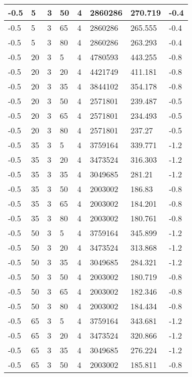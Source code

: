 \begin{longtable}{|p{1.4cm}|p{1.4cm}|p{1.4cm}|p{1.4cm}|p{1.4cm}|p{1.4cm}|p{1.4cm}|p{1.5cm}|}
        -0.5 & 5 & 3 & 50 & 4 & 2860286 & 270.719 & -0.4 \\ \hline
        -0.5 & 5 & 3 & 65 & 4 & 2860286 & 265.555 & -0.4 \\ \hline
        -0.5 & 5 & 3 & 80 & 4 & 2860286 & 263.293 & -0.4 \\ \hline
        -0.5 & 20 & 3 & 5 & 4 & 4780593 & 443.255 & -0.8 \\ \hline
        -0.5 & 20 & 3 & 20 & 4 & 4421749 & 411.181 & -0.8 \\ \hline
        -0.5 & 20 & 3 & 35 & 4 & 3844102 & 354.178 & -0.8 \\ \hline
        -0.5 & 20 & 3 & 50 & 4 & 2571801 & 239.487 & -0.5 \\ \hline
        -0.5 & 20 & 3 & 65 & 4 & 2571801 & 234.493 & -0.5 \\ \hline
        -0.5 & 20 & 3 & 80 & 4 & 2571801 & 237.27 & -0.5 \\ \hline
        -0.5 & 35 & 3 & 5 & 4 & 3759164 & 339.771 & -1.2 \\ \hline
        -0.5 & 35 & 3 & 20 & 4 & 3473524 & 316.303 & -1.2 \\ \hline
        -0.5 & 35 & 3 & 35 & 4 & 3049685 & 281.21 & -1.2 \\ \hline
        -0.5 & 35 & 3 & 50 & 4 & 2003002 & 186.83 & -0.8 \\ \hline
        -0.5 & 35 & 3 & 65 & 4 & 2003002 & 184.201 & -0.8 \\ \hline
        -0.5 & 35 & 3 & 80 & 4 & 2003002 & 180.761 & -0.8 \\ \hline
        -0.5 & 50 & 3 & 5 & 4 & 3759164 & 345.899 & -1.2 \\ \hline
        -0.5 & 50 & 3 & 20 & 4 & 3473524 & 313.868 & -1.2 \\ \hline
        -0.5 & 50 & 3 & 35 & 4 & 3049685 & 284.321 & -1.2 \\ \hline
        -0.5 & 50 & 3 & 50 & 4 & 2003002 & 180.719 & -0.8 \\ \hline
        -0.5 & 50 & 3 & 65 & 4 & 2003002 & 182.346 & -0.8 \\ \hline
        -0.5 & 50 & 3 & 80 & 4 & 2003002 & 184.434 & -0.8 \\ \hline
        -0.5 & 65 & 3 & 5 & 4 & 3759164 & 343.681 & -1.2 \\ \hline
        -0.5 & 65 & 3 & 20 & 4 & 3473524 & 320.866 & -1.2 \\ \hline
        -0.5 & 65 & 3 & 35 & 4 & 3049685 & 276.224 & -1.2 \\ \hline
        -0.5 & 65 & 3 & 50 & 4 & 2003002 & 185.811 & -0.8 \\ \hline

\end{longtable}
